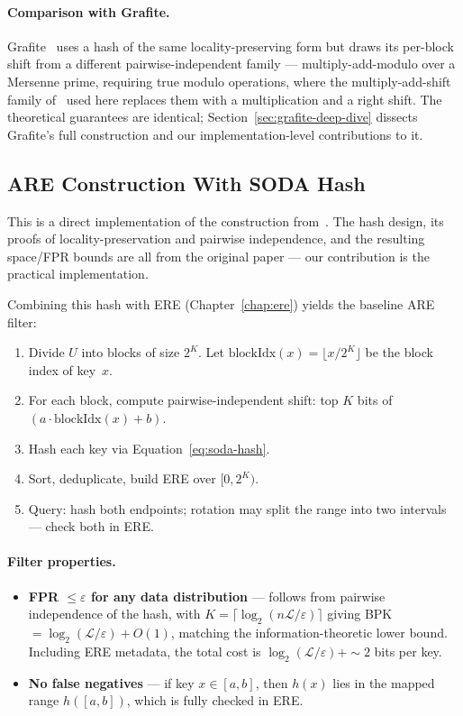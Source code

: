 \paragraph{Comparison with Grafite.}
Grafite~\citep{grafite2024} uses a hash of the same locality-preserving form but draws
its per-block shift from a different pairwise-independent family --- multiply-add-modulo
over a Mersenne prime, requiring true modulo operations, where the multiply-add-shift
family of~\citet{dietzfelbinger1996universal} used here replaces them with a multiplication
and a right shift. The theoretical guarantees are identical;
Section~\ref{sec:grafite-deep-dive} dissects Grafite's full construction and our
implementation-level contributions to it.

\subsection{ARE Construction With SODA Hash}

This is a direct implementation of the construction from~\citet[§3]{goswami2015approximate}.
The hash design, its proofs of locality-preservation and pairwise independence, and the
resulting space/FPR bounds are all from the original paper --- our contribution is the
practical implementation.

Combining this hash with ERE (Chapter~\ref{chap:ere}) yields the baseline ARE filter:
\begin{enumerate}
    \item Divide $U$ into blocks of size $2^K$. Let $\text{blockIdx}(x) = \lfloor x / 2^K \rfloor$
    be the block index of key~$x$.
    \item For each block, compute pairwise-independent shift: top $K$ bits of
    $(a \cdot \text{blockIdx}(x) + b)$.
    \item Hash each key via Equation~\eqref{eq:soda-hash}.
    \item Sort, deduplicate, build ERE over $[0, 2^K)$.
    \item Query: hash both endpoints; rotation may split the range into two
    intervals --- check both in ERE.
\end{enumerate}

\paragraph{Filter properties.}
\begin{itemize}
    \item \textbf{FPR $\leq \varepsilon$ for any data distribution} --- follows from pairwise
    independence of the hash, with $K = \lceil \log_2(n\mathcal{L}/\varepsilon) \rceil$ giving
    BPK~$= \log_2(\mathcal{L}/\varepsilon) + O(1)$, matching the information-theoretic lower bound.
    Including ERE metadata, the total cost is $\log_2(\mathcal{L}/\varepsilon) + {\sim}2$ bits per key.
    \item \textbf{No false negatives} --- if key $x \in [a, b]$, then
    $h(x)$ lies in the mapped range $h([a, b])$, which is fully checked in ERE.
\end{itemize}

